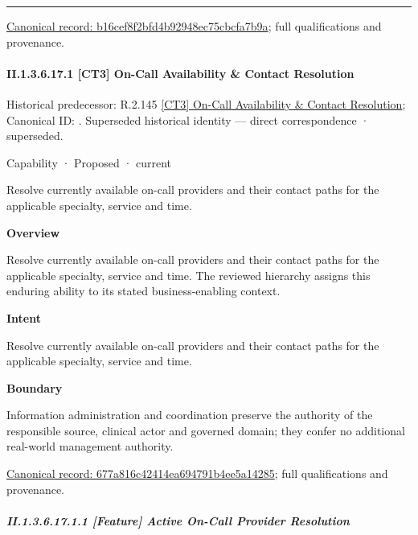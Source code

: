 \medskip\hrule\medskip

{\footnotesize \href{../../../../../../../continuum/strategy/capability/b16cef8f2bfd4b92948ec75cbcfa7b9a.md}{Canonical record: b16cef8f2bfd4b92948ec75cbcfa7b9a}; full qualifications and provenance.}\par
\paragraph*{II.1.3.6.17.1 [CT3] On-Call Availability \& Contact Resolution}
\label{navigation:II.1.3.6.17.1}

{\small Historical predecessor: R.2.145 \hyperref[element:a03075a46f75497f8c6ba95d9c9e27c4]{[CT3] On-Call Availability \& Contact Resolution}; Canonical ID: \texttt{}. Superseded historical identity — direct correspondence · superseded.}\par
\label{element:677a816c42414ea694791b4ee5a14285}
{\small Capability · Proposed · current}\par

Resolve currently available on-call providers and their contact paths for the applicable specialty, service and time.



\textbf{Overview}



Resolve currently available on-call providers and their contact paths for the applicable specialty, service and time. The reviewed hierarchy assigns this enduring ability to its stated business-enabling context.



\textbf{Intent}



Resolve currently available on-call providers and their contact paths for the applicable specialty, service and time.



\textbf{Boundary}



Information administration and coordination preserve the authority of the responsible source, clinical actor and governed domain; they confer no additional real-world management authority.


{\footnotesize \href{../../../../../../../continuum/strategy/capability/677a816c42414ea694791b4ee5a14285.md}{Canonical record: 677a816c42414ea694791b4ee5a14285}; full qualifications and provenance.}\par
\subparagraph*{II.1.3.6.17.1.1 [Feature] Active On-Call Provider Resolution}
\label{navigation:II.1.3.6.17.1.1}

